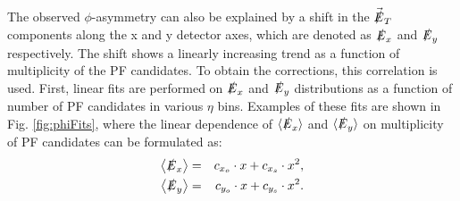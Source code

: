 The observed $\phi$-asymmetry can also be explained by a shift in the $\vec{\slashed{E}}_T$ components along the x and y detector axes, which are denoted as $\slashed{E}_x$ and $\slashed{E}_y$ respectively. The shift shows a linearly increasing trend as a function of multiplicity of the PF candidates. To obtain the corrections, this correlation is used. First, linear fits are performed on $\slashed{E}_x$ and $\slashed{E}_y$ distributions as a function of number of PF candidates in various $\eta$ bins. Examples of these fits are shown in Fig. \ref{fig:phiFits}, where the linear dependence of $\langle\slashed{E}_x\rangle$ and $\langle\slashed{E}_y\rangle$ 
on multiplicity of PF candidates can be formulated as:
\begin{eqnarray}
\left<\slashed{E}_x \right> & = & c_{x_o} \cdot x + c_{x_s} \cdot x^2, \nonumber \\
\left<\slashed{E}_y \right> & = & c_{y_o} \cdot x + c_{y_s} \cdot x^2.
\label{eq:metPhiAsymmetryFitModel}
\end{eqnarray}
